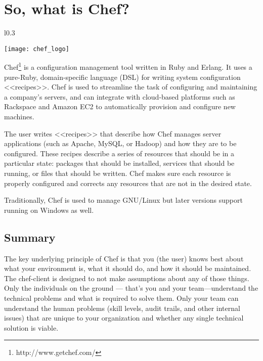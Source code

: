 \chapter{So, what is Chef?}

\begin{wrapfigure}{l}{0.3\textwidth}
  \vspace{-20pt}
  \begin{center}
    \texttt{[image: chef\_logo]}
  \end{center}
  \vspace{-20pt}
\end{wrapfigure}

Chef\footnote{http://www.getchef.com/} is a configuration management tool written in Ruby and Erlang. It uses a pure-Ruby, domain-specific language (DSL) for writing system configuration <<recipes>>. Chef is used to streamline the task of configuring and maintaining a company's servers, and can integrate with cloud-based platforms such as Rackspace and Amazon EC2 to automatically provision and configure new machines.

The user writes <<recipes>> that describe how Chef manages server applications (such as Apache, MySQL, or Hadoop) and how they are to be configured. These recipes describe a series of resources that should be in a particular state: packages that should be installed, services that should be running, or files that should be written. Chef makes sure each resource is properly configured and corrects any resources that are not in the desired state.

Traditionally, Chef is used to manage GNU/Linux but later versions support running on Windows as well.





\section{Summary}

The key underlying principle of Chef is that you (the user) knows best about what your environment is, what it should do, and how it should be maintained. The chef-client is designed to not make assumptions about any of those things. Only the individuals on the ground — that's you and your team—understand the technical problems and what is required to solve them. Only your team can understand the human problems (skill levels, audit trails, and other internal issues) that are unique to your organization and whether any single technical solution is viable.

